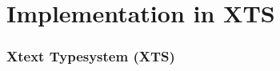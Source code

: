 \section[XTS]{Implementation in XTS}

\begin{frame}
\frametitle{Xtext Typesystem (XTS)}
\tableofcontents[currentsection]
\end{frame}